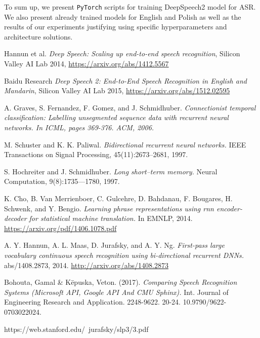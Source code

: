 \documentclass[licencjacka,en]{pracamgr}
\begin{document}
To sum up, we present \texttt{PyTorch} scripts for training DeepSpeech2 model for ASR. We also present already trained models for English and Polish as well as the results of our experiments justifying using specific hyperparameters and architecture solutions.\\

\begin{thebibliography}{99}

 Hannun et al. 
\textit{Deep Speech: Scaling up end-to-end speech recognition}, Silicon Valley AI Lab 2014, \href{https://arxiv.org/abs/1412.5567}{https://arxiv.org/abs/1412.5567}
  
 Baidu Research \textit{Deep Speech 2: End-to-End Speech Recognition in English and Mandarin}, Silicon Valley AI Lab 2015, \href{https://arxiv.org/abs/1512.02595}{https://arxiv.org/abs/1512.02595}

 A. Graves, S. Fernandez, F. Gomez, and J. Schmidhuber. \textit{Connectionist temporal classification:
Labelling unsegmented sequence data with recurrent neural networks. In ICML, pages 369-376. ACM, 2006.}

 M. Schuster and K. K. Paliwal. \textit{Bidirectional recurrent neural networks.} IEEE Transactions on Signal Processing, 45(11):2673–2681, 1997.

 S. Hochreiter and J. Schmidhuber. \textit{Long short--term memory.} Neural Computation, 9(8):1735—1780, 1997.

 K. Cho, B. Van Merrienboer, C. Gulcehre, D. Bahdanau, F. Bougares, H. Schwenk, and Y. Bengio. \textit{Learning phrase representations using rnn encoder-decoder for statistical machine translation.} In EMNLP, 2014. \href{https://arxiv.org/pdf/1406.1078.pdf}{https://arxiv.org/pdf/1406.1078.pdf}

 A. Y. Hannun, A. L. Maas, D. Jurafsky, and A. Y. Ng. \textit{First-pass large vocabulary continuous speech recognition using bi-directional recurrent DNNs.} abs/1408.2873, 2014. \href{http://arxiv.org/abs/1408.2873}{http://arxiv.org/abs/1408.2873}

 Bohouta, Gamal \& Këpuska, Veton. (2017). \textit{Comparing Speech Recognition Systems (Microsoft API, Google API And CMU Sphinx).} Int. Journal of Engineering Research and Application. 2248-9622. 20-24. 10.9790/9622-0703022024.

 https://web.stanford.edu/~jurafsky/slp3/3.pdf


\end{thebibliography}
\end{document}
